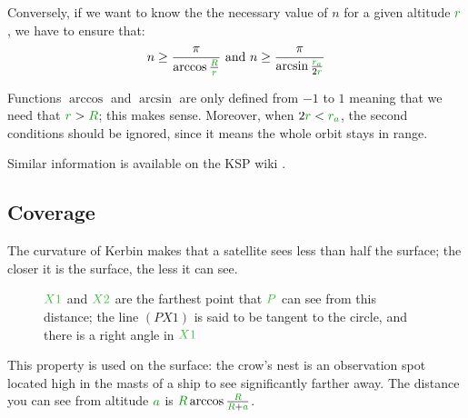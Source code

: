 Conversely, if we want to know the the necessary value of $n$ for a
given altitude $\dist{r}$, we have to ensure that:
\[
n
\ge
\frac {\pi} {\arccos \frac {\dist{R}} {\dist{r}}}
\text{ and }
n
\ge
\frac {\pi} {\arcsin \frac {\dist{r_a}} {2 \dist{r}}}
\]

\begin{remark}
Functions $\arccos$ and $\arcsin$ are only defined from $-1$ to $1$
meaning that we need that $\dist{r} > \dist{R}$; this makes sense.
Moreover, when $2 \dist{r} < \dist{r_a}$, the second conditions should
be ignored, since it means the whole orbit stays in range.
\end{remark}

Similar information is available on the KSP wiki \cite{coverage}.


\subsection{Coverage}

The curvature of Kerbin makes that a satellite sees less than half the
surface; the closer it is the surface, the less it can see.

\begin{figure}[H]
\centering
{}
\caption{
	$\posit{X1}$ and $\posit{X2}$ are the farthest point that
	$\posit{P}$ can see from this distance; the line $(PX1)$ is
	said to be tangent to the circle, and there is a right angle
	in $\posit{X1}$
}
\end{figure}

\begin{remark}
This property is used on the surface: the crow's nest is an observation
spot located high in the masts of a ship to see significantly farther
away. The distance you can see from altitude $\dist{a}$ is $\dist{R}
\arccos \frac {\dist{R}} {\dist{R} + \dist{a}}$.
\end{remark}

